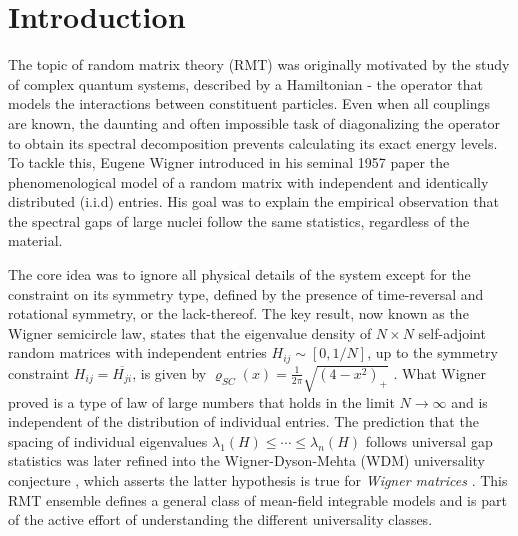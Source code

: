 \documentclass[11pt]{article}
\begin{document}
\setcounter{page}{1}
\section{Introduction}
\label{sec:intro}
The topic of random matrix theory (RMT) was originally motivated by the study of complex quantum systems, described by a Hamiltonian  - the operator that models the interactions between constituent particles. Even when all couplings are known, the daunting and often impossible task of diagonalizing the operator to obtain its spectral decomposition prevents calculating its exact energy levels. To tackle this, Eugene Wigner introduced in his seminal 1957 paper \cite{wigner} the phenomenological model of a random matrix with independent and identically distributed (i.i.d) entries. His goal was to explain the empirical observation that the spectral gaps of large nuclei follow the same statistics, regardless of the material. 

\vspace{0.5cm}
\noindent The core idea was to ignore all physical details of the system except for the constraint on its symmetry type, defined by the presence of time-reversal and rotational symmetry, or the lack-thereof. The key result, now known as the Wigner semicircle law, states that the eigenvalue density of \( N \times N \) self-adjoint random matrices with independent entries $H_{ij}\sim [0, 1/N]$, up to the symmetry constraint $H_{ij} = \overline{H_{ji}}$, is given by $\varrho_{SC}(x)=\frac{1}{2\pi} \sqrt{(4-x^2)_+}$ \cite{dynamic}. What Wigner proved is a type of law of large numbers that holds in the limit \( N \to \infty \) and is independent of the distribution of individual entries. The prediction that the spacing of individual eigenvalues $\lambda_1(H)\leq \cdots \leq \lambda_n(H)$ follows universal gap statistics was later refined into the Wigner-Dyson-Mehta (WDM) universality conjecture \cite{mehta}, which asserts the latter hypothesis is true for \textit{Wigner matrices} \cite{taoWDM}. This RMT ensemble defines a general class of mean-field integrable models and is part of the active effort of understanding the different universality classes. 
\end{document}
